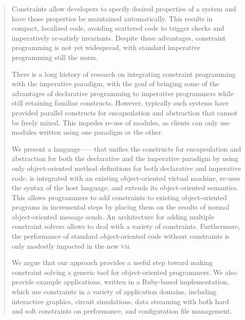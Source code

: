 \begin{abstract}
  Constraints allow developers to specify desired properties of a
  system and have those properties be maintained automatically.  This
  results in compact, localized code, avoiding scattered code to
  trigger checks and imperatively re-satisfy invariants.  Despite
  these advantages, constraint programming is not yet widespread, with
  standard imperative programming still the norm.

  There is a long history of research on integrating constraint
  programming with the imperative paradigm, with the goal of bringing
  some of the advantages of declarative programming to imperative
  programmers while still retaining familiar constructs.  However,
  typically such systems have provided parallel constructs for
  encapsulation and abstraction that cannot be freely mixed. This
  impedes re-use of modules, as clients can only use modules written
  using one paradigm or the other.

  We present a language---\langname---that unifies the constructs for
  encapsulation and abstraction for both the declarative and the
  imperative paradigm by using only object-oriented method definitions
  for both declarative and imperative code. \langname is integrated
  with an existing object-oriented virtual machine, re-uses the syntax
  of the host language, and extends its object-oriented
  semantics. This allows programmers to add constraints to existing
  object-oriented programs in incremental steps by placing them on the
  results of normal object-oriented message sends. An architecture for
  adding multiple constraint solvers allows \langname to deal with a
  variety of constraints. Furthermore, the performance of standard
  object-oriented code without constraints is only modestly impacted
  in the new \textsc{vm}.

  We argue that our approach provides a useful step toward making
  constraint solving a generic tool for object-oriented programmers.
  We also provide example applications, written in a Ruby-based
  implementation, which use constraints in a variety of application
  domains, including interactive graphics, circuit simulations, data
  streaming with both hard and soft constraints on performance, and
  configuration file management.



\end{abstract}
